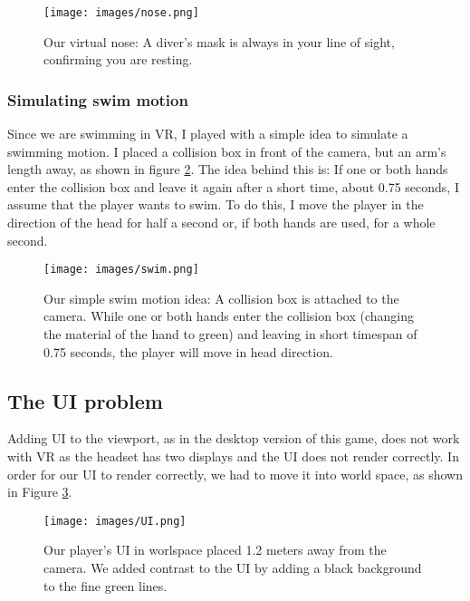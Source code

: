\documentclass[letterpaper, 10 pt, conference]{ieeeconf}  %
\begin{document}
 \begin{figure}[!ht]
    \caption{Our virtual nose: A diver's mask is always in your line of sight, confirming you are resting.}
    \centering
    \texttt{[image: images/nose.png]}
    \label{fig:nose}
\end{figure}

\subsubsection{Simulating swim motion}

Since we are swimming in VR, I played with a simple idea to simulate a swimming motion.
I placed a collision box in front of the camera, but an arm's length away, as shown in figure \ref{fig:swim}.
The idea behind this is: 
If one or both hands enter the collision box and leave it again after a short time, about 0.75 seconds, I assume that the player wants to swim.
To do this, I move the player in the direction of the head for half a second or, if both hands are used, for a whole second.

\begin{figure}[!ht]
    \caption{Our simple swim motion idea: A collision box is attached to the camera.
    While one or both hands enter the collision box (changing the material of the hand to green) and leaving in short timespan of 0.75 seconds, the player will move in head direction.}
    \centering
    \texttt{[image: images/swim.png]}
    \label{fig:swim}
\end{figure}

\subsection{The UI problem}

Adding UI to the viewport, as in the desktop version of this game, does not work with VR as the headset has two displays and the UI does not render correctly.
In order for our UI to render correctly, we had to move it into world space, as shown in Figure \ref{fig:UI}.

\begin{figure}[!ht]
    \caption{Our player's UI in worlspace placed 1.2 meters away from the camera. We added contrast to the UI by adding a black background to the fine green lines.}
    \centering
    \texttt{[image: images/UI.png]}
    \label{fig:UI}
\end{figure}
\end{document}
